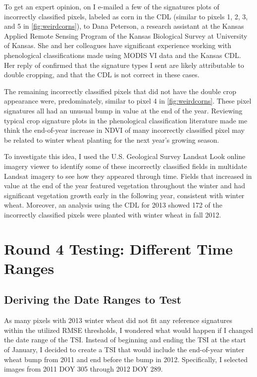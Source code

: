 To get an expert opinion, on  I e-mailed a few of the signatures plots of incorrectly classified pixels, labeled as corn in the CDL (similar to pixels 1, 2, 3, and 5 in \cref{fig:weirdcorns}), to Dana Peterson, a research assistant at the Kansas Applied Remote Sensing Program of the Kansas Biological Survey at University of Kansas. She and her colleagues have significant experience working with phenological classifications made using MODIS VI data and the Kansas CDL. Her reply of  confirmed that the signature types I sent are likely attributable to double cropping, and that the CDL is not correct in these cases.

The remaining incorrectly classified pixels that did not have the double crop appearance were, predominately, similar to pixel 4 in \cref{fig:weirdcorns}. These pixel signatures all had an unusual bump in value at the end of the year. Reviewing typical crop signature plots in the phenological classification literature made me think the end-of-year increase in NDVI of many incorrectly classified pixel may be related to winter wheat planting for the next year’s growing season.

To investigate this idea, I used the U.S. Geological Survey Landsat Look online imagery viewer to identify some of these incorrectly classified fields in multidate Landsat imagery to see how they appeared through time. Fields that increased in value at the end of the year featured vegetation throughout the winter and had significant vegetation growth early in the following year, consistent with winter wheat. Moreover, an analysis using the CDL for 2013 showed 172 of the incorrectly classified pixels were planted with winter wheat in fall 2012.


\section{Round 4 Testing: Different Time Ranges}
\label{appendix:testing:r4}

\subsection*{Deriving the Date Ranges to Test}

As many pixels with 2013 winter wheat did not fit any reference signatures within the utilized RMSE thresholds, I wondered what would happen if I changed the date range of the TSI. Instead of beginning and ending the TSI at the start of January, I decided to create a TSI that would include the end-of-year winter wheat bump from 2011 and end before the bump in 2012. Specifically, I selected images from 2011 DOY 305 through 2012 DOY 289.

